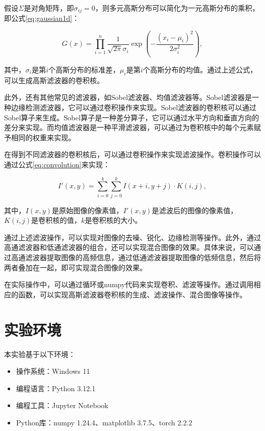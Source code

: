 \documentclass{article}
\begin{document}
假设$\Sigma$是对角矩阵，即$\sigma_{ij}=0$，则多元高斯分布可以简化为一元高斯分布的乘积，即公式\ref{eq:gaussian1d}：

\begin{equation}
    G(x) = \prod_{i=1}^{n} \frac{1}{\sqrt{2\pi}\sigma_i} \exp(-\frac{(x_i-\mu_i)^2}{2\sigma_i^2}),
    \label{eq:gaussian1d}
\end{equation}

其中，$\sigma_i$是第$i$个高斯分布的标准差，$\mu_i$是第$i$个高斯分布的均值。通过上述公式，可以生成高斯滤波器的卷积核。

此外，还有其他常见的滤波器，如Sobel滤波器、均值滤波器等。Sobel滤波器是一种边缘检测滤波器，它可以通过卷积操作来实现。Sobel滤波器的卷积核可以通过Sobel算子来生成。Sobel算子是一种差分算子，它可以通过水平方向和垂直方向的差分来实现。而均值滤波器是一种平滑滤波器，可以通过为卷积核中的每个元素赋予相同的权重来实现。

在得到不同滤波器的卷积核后，可以通过卷积操作来实现滤波操作。卷积操作可以通过公式\ref{eq:convolution}来实现：

\begin{equation}
    I'(x, y) = \sum_{i=0}^{k} \sum_{j=0}^{k} I(x+i, y+j) \cdot K(i, j),
    \label{eq:convolution}
\end{equation}

其中，$I(x, y)$是原始图像的像素值，$I'(x, y)$是滤波后的图像的像素值，$K(i, j)$是卷积核的值，$k$是卷积核的大小。

通过上述滤波操作，可以实现对图像的去噪、锐化、边缘检测等操作。此外，通过高通滤波器和低通滤波器的组合，还可以实现混合图像的效果。具体来说，可以通过高通滤波器提取图像的高频信息，通过低通滤波器提取图像的低频信息，然后将两者叠加在一起，即可实现混合图像的效果。

在实际操作中，可以通过循环或numpy代码来实现卷积、滤波等操作。通过调用相应的函数，可以实现高斯滤波器卷积核的生成、滤波操作、混合图像等操作。

\section{实验环境}

本实验基于以下环境：

\begin{itemize}
    \item 操作系统：Windows 11
    \item 编程语言：Python 3.12.1
    \item 编程工具：Jupyter Notebook
    \item Python库：numpy 1.24.4、matplotlib 3.7.5、torch 2.2.2
\end{itemize}
\end{document}
